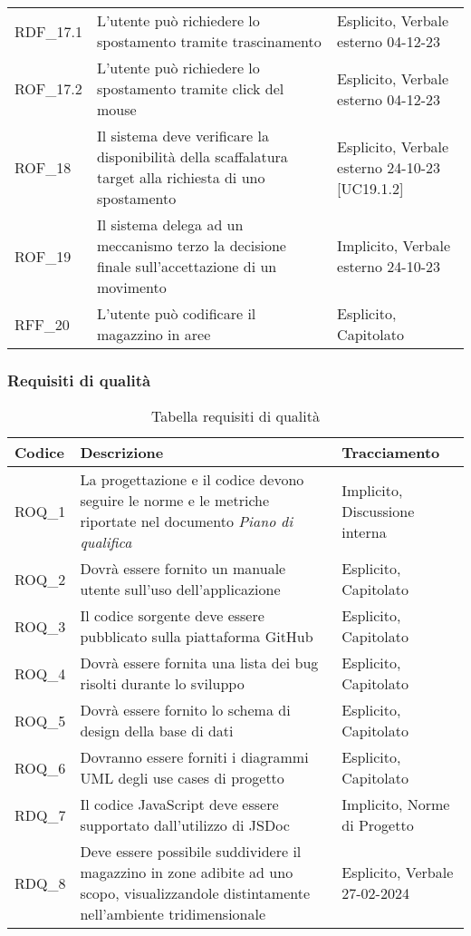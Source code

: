 \begin{xltabular}{\textwidth}{ p{0.1\textwidth} | X | p{0.3\textwidth} }
    RDF\_17.1 & L'utente può richiedere lo spostamento tramite trascinamento & Esplicito, Verbale esterno 04-12-23\\
    ROF\_17.2 & L'utente può richiedere lo spostamento tramite click del mouse & Esplicito, Verbale esterno 04-12-23\\
    ROF\_18 & Il sistema deve verificare la disponibilità della scaffalatura target alla richiesta di uno spostamento & Esplicito, Verbale esterno 24-10-23 [UC19.1.2]\\
    ROF\_19 & Il sistema delega ad un meccanismo terzo la decisione finale sull'accettazione di un movimento & Implicito, Verbale esterno 24-10-23\\
    RFF\_20 & L'utente può codificare il magazzino in aree & Esplicito, Capitolato \\
    \hline
\end{xltabular}


\subsubsection{Requisiti di qualità}\label{subsec:requisiti_qualita}
\begin{xltabular}{\textwidth}{ p{0.1\textwidth} | X | p{0.3\textwidth} }
    \textbf{\color{white} Codice} & \textbf{\color{white} Descrizione} & \textbf{\color{white} Tracciamento} \\ 
    \endhead

    \caption{Tabella requisiti di qualità}
    \endlastfoot

    ROQ\_1 & La progettazione e il codice devono seguire le norme e le metriche riportate nel documento \textit{Piano di qualifica} & Implicito, Discussione interna \\
    ROQ\_2 & Dovrà essere fornito un manuale utente sull'uso dell'applicazione & Esplicito, Capitolato \\
    ROQ\_3 & Il codice sorgente deve essere pubblicato sulla piattaforma GitHub & Esplicito, Capitolato \\
    ROQ\_4 & Dovrà essere fornita una lista dei bug risolti durante lo sviluppo & Esplicito, Capitolato \\ 
    ROQ\_5 & Dovrà essere fornito lo schema di design della base di dati & Esplicito, Capitolato \\ 
    ROQ\_6 & Dovranno essere forniti i diagrammi UML degli use cases di progetto & Esplicito, Capitolato \\ 
    RDQ\_7 & Il codice JavaScript deve essere supportato dall'utilizzo di JSDoc & Implicito, Norme di Progetto \\
    RDQ\_8 & Deve essere possibile suddividere il magazzino in zone adibite ad uno scopo, visualizzandole distintamente nell'ambiente tridimensionale & Esplicito, Verbale 27-02-2024 \\
    \hline
\end{xltabular}



